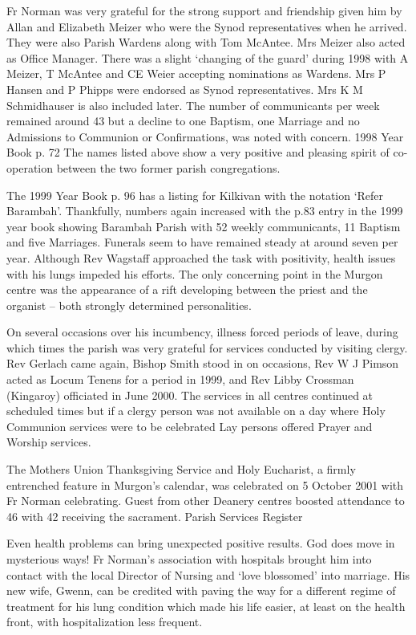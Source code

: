 Fr Norman was very grateful for the strong support and friendship given him by Allan and Elizabeth Meizer who were the Synod representatives when he arrived. They were also Parish Wardens along with Tom McAntee. Mrs Meizer also acted as Office Manager. There was a slight `changing of the guard' during 1998 with A Meizer, T McAntee and CE Weier accepting nominations as Wardens. Mrs P Hansen and P Phipps were endorsed as Synod representatives. Mrs K M Schmidhauser is also included later. The number of communicants per week remained around 43 but a decline to one Baptism, one Marriage and no Admissions to Communion or Confirmations, was noted with concern. 1998 Year Book p. 72 The names listed above show a very positive and pleasing spirit of co-operation between the two former parish congregations.

The 1999 Year Book p. 96 has a listing for Kilkivan with the notation `Refer Barambah'. Thankfully, numbers again increased with the p.83 entry in the 1999 year book showing Barambah Parish with 52 weekly communicants, 11 Baptism and five Marriages. Funerals seem to have remained steady at around seven per year. Although Rev Wagstaff approached the task with positivity, health issues with his lungs impeded his efforts. The only concerning point in the Murgon centre was the appearance of a rift developing between the priest and the organist -- both strongly determined personalities.

On several occasions over his incumbency, illness forced periods of leave, during which times the parish was very grateful for services conducted by visiting clergy. Rev Gerlach came again, Bishop Smith stood in on occasions, Rev W J Pimson acted as Locum Tenens for a period in 1999, and Rev Libby Crossman (Kingaroy) officiated in June 2000. The services in all centres continued at scheduled times but if a clergy person was not available on a day where Holy Communion services were to be celebrated Lay persons offered Prayer and Worship services.

The Mothers Union Thanksgiving Service and Holy Eucharist, a firmly entrenched feature in Murgon's calendar, was celebrated on 5 October 2001 with Fr Norman celebrating. Guest from other Deanery centres boosted attendance to 46 with 42 receiving the sacrament. Parish Services Register

Even health problems can bring unexpected positive results. God does move in mysterious ways! Fr Norman's association with hospitals brought him into contact with the local Director of Nursing and `love blossomed' into marriage. His new wife, Gwenn, can be credited with paving the way for a different regime of treatment for his lung condition which made his life easier, at least on the health front, with hospitalization less frequent.

